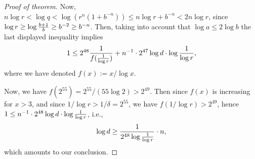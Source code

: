 \documentclass[leqno,12pt]{article} %
\def\P{{{\mathbb P}}}
\theoremstyle{plain} %
\theoremstyle{definition} %
\begin{document}
\begin{proof} [Proof of theorem]
Now, $n\log r<\log q<\log (r^n(1+b^{-n}))\le n\log r+b^{-n}<2n\log r$, since $\log r\ge \log {b+1\over b}\ge b^{-2}\ge b^{-n}$.   Then, taking into account that $\log a\le 2\log b$ the last displayed  inequality implies
\begin{equation*}
1\le  %
2^{48}{1\over f({1\over \log r})}+n^{-1}\cdot 2^{47}\log d\cdot  \log {1\over \log r}, 
\end{equation*} 
where we have denoted $f(x):= x/\log x$. 









Now,  we have  $f(2^{55})=2^{55}/(55\log 2)>2^{49}$. Then since   $f(x)$ is increasing for $x>3$, and since $1/\log r>1/\delta=2^{55}$, we have $f(1/\log r)> 2^{49}$, hence $1\le   n^{-1}\cdot 2^{48}\log d\cdot  \log {1\over \log r}$, i.e.,
\begin{equation*}
\log d\ge {1\over 2^{48}  \log {1\over \log r}}\cdot n,
\end{equation*} 
which amounts to our conclusion. 
\end{proof}






 


 
\end{document}
